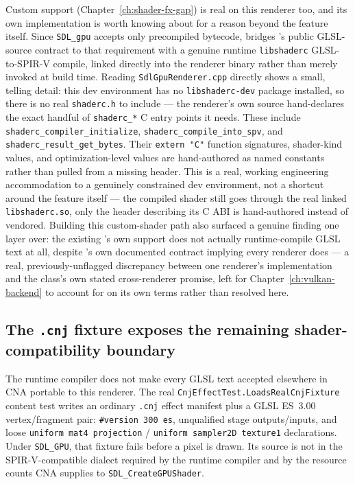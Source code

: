 Custom  support (Chapter~\ref{ch:shader-fx-gap}) is real on this renderer
too, and its own implementation is worth knowing about for a reason beyond the feature itself.
Since \texttt{SDL\_gpu} accepts only precompiled bytecode,  bridges
's public GLSL-source contract to that requirement with a genuine runtime
\texttt{libshaderc} GLSL-to-SPIR-V compile, linked directly into the renderer binary rather than
merely invoked at build time. Reading \texttt{SdlGpuRenderer.cpp} directly shows a small,
telling detail: this dev environment has no \texttt{libshaderc-dev} package installed, so there
is no real \texttt{shaderc.h} to include --- the renderer's own source hand-declares the exact
handful of \texttt{shaderc\_*} C entry points it needs. These include
\texttt{shaderc\_\allowbreak{}compiler\_\allowbreak{}initialize},
\texttt{shaderc\_\allowbreak{}compile\_\allowbreak{}into\_\allowbreak{}spv}, and
\texttt{shaderc\_\allowbreak{}result\_\allowbreak{}get\_\allowbreak{}bytes}. Their
\texttt{extern "C"} function signatures, shader-kind values, and optimization-level values are
hand-authored as named constants rather than pulled from a missing header.
This is a real, working engineering accommodation to a genuinely constrained dev environment,
not a shortcut around the feature itself --- the compiled shader still goes through the real
linked \texttt{libshaderc.so}, only the header describing its C ABI is hand-authored instead of
vendored. Building this custom-shader path also surfaced a genuine finding one layer over: the
existing 's own  support does not
actually runtime-compile GLSL text at all, despite 's own documented
contract implying every renderer does --- a real, previously-unflagged discrepancy between one
renderer's implementation and the class's own stated cross-renderer promise, left for
Chapter~\ref{ch:vulkan-backend} to account for on its own terms rather than resolved here.

\subsection{The \texttt{.cnj} fixture exposes the remaining shader-compatibility boundary}

The runtime compiler does not make every GLSL text accepted elsewhere in CNA portable to this
renderer. The real \texttt{CnjEffectTest.LoadsRealCnjFixture} content test writes an ordinary
\texttt{.cnj} effect manifest plus a GLSL ES~3.00 vertex/fragment pair: \texttt{\#version 300 es},
unqualified stage outputs/inputs, and loose \texttt{uniform mat4 projection} /
\texttt{uniform sampler2D texture1} declarations. Under \texttt{SDL\_GPU}, that fixture fails
before a pixel is drawn. Its source is not in the SPIR-V-compatible dialect required by the
runtime compiler and by the resource counts CNA supplies to \texttt{SDL\_CreateGPUShader}.


